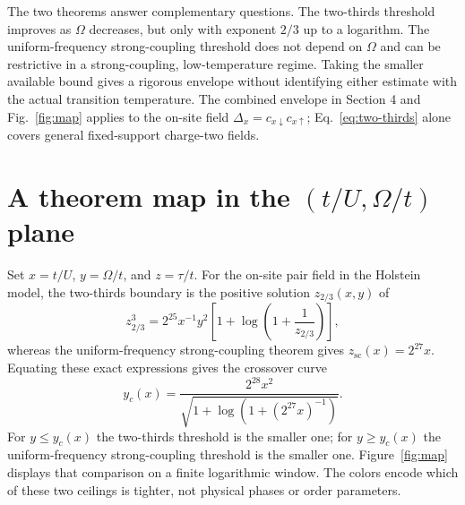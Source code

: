 \documentclass[11pt]{article}
\begin{document}
The two theorems answer complementary questions. The two-thirds threshold improves as $\Omega$ decreases, but only with exponent $2/3$ up to a logarithm. The uniform-frequency strong-coupling threshold does not depend on $\Omega$ and can be restrictive in a strong-coupling, low-temperature regime. Taking the smaller available bound gives a rigorous envelope without identifying either estimate with the actual transition temperature. The combined envelope in Section 4 and Fig.~\ref{fig:map} applies to the on-site field $\Delta_x=c_{x\downarrow}c_{x\uparrow}$; Eq.~\eqref{eq:two-thirds} alone covers general fixed-support charge-two fields.

\section{A theorem map in the \texorpdfstring{$(t/U,\Omega/t)$}{(t/U, Omega/t)} plane}

Set $x=t/U$, $y=\Omega/t$, and $z=\tau/t$. For the on-site pair field in the Holstein model, the two-thirds boundary is the positive solution $z_{2/3}(x,y)$ of
\begin{equation}\label{eq:z-two-thirds}
 z_{2/3}^3=2^{25}x^{-1}y^2\left[1+\log\left(1+\frac{1}{z_{2/3}}\right)\right],
\end{equation}
whereas the uniform-frequency strong-coupling theorem gives $z_{\mathrm{sc}}(x)=2^{27}x$. Equating these exact expressions gives the crossover curve
\begin{equation}\label{eq:crossover}
 y_c(x)=\frac{2^{28}x^2}{\sqrt{1+\log\left(1+(2^{27}x)^{-1}\right)}}.
\end{equation}
For $y\leq y_c(x)$ the two-thirds threshold is the smaller one; for $y\geq y_c(x)$ the uniform-frequency strong-coupling threshold is the smaller one. Figure~\ref{fig:map} displays that comparison on a finite logarithmic window. The colors encode which of these two ceilings is tighter, not physical phases or order parameters.
\end{document}
